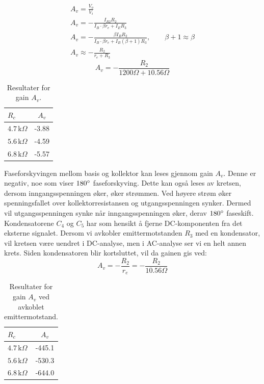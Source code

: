 \noindent
\begin{gather*}
A_v = \frac{V_o}{V_i} \\
A_v = - \frac{I_{R2}R_2}{I_B\cdot\beta r_e + I_E R_3} \\
A_v = - \frac{\beta I_B R_2}{I_B\cdot\beta r_e + I_B \left(\beta + 1\right) R_3}, \qquad \beta + 1 \approx \beta \\
A_v \approx - \frac{R_2}{r_e + R_3}
\end{gather*}
\vspace{1em}
\[
A_v = - \frac{R_2}{1200\Omega + 10.56\Omega}
\]







\begin{table}[H]
\centering
\caption{Resultater for gain $A_v$.}
\label{tab:gain_utregnet}
\vspace{1em}
\begin{tabular}{lc}
\toprule
\textbf{$R_c$} & \textbf{$A_v$} \\
\midrule
$4.7\,\text{k}\Omega$ & -3.88 \\
$5.6\,\text{k}\Omega$ & -4.59 \\
$6.8\,\text{k}\Omega$ & -5.57 \\
\bottomrule
\end{tabular}
\end{table}

\noindent
Faseforskyvingen mellom basis og kollektor kan leses gjennom gain $A_v$. Denne er negativ, noe som viser $180\degree$ faseforskyving. Dette kan også leses av kretsen, dersom inngangsspenningen øker, øker strømmen. Ved høyere strøm øker spenningsfallet over kollektorresistansen og utgangsspenningen synker. Dermed vil utgangsspenningen synke når inngangsspenningen øker, derav $180\degree$ faseskift. Kondensatorene $C_4$ og $C_5$ har som hensikt å fjerne DC-komponenten fra det eksterne signalet. Dersom vi avkobler emittermotstanden $R_3$ med en kondensator, vil kretsen være uendret i DC-analyse, men i AC-analyse ser vi en helt annen krets. Siden kondensatoren blir kortsluttet, vil da gainen gis ved:
\[
A_v = - \frac{R_2}{r_e} = - \frac{R_2}{10.56\Omega}
\]

\begin{table}[H]
\centering
\caption{Resultater for gain $A_v$ ved avkoblet emittermotstand.}
\label{tab:gain_utregnet_avkoblet_emitter}
\vspace{1em}
\begin{tabular}{lc}
\toprule
\textbf{$R_c$} & \textbf{$A_v$} \\
\midrule
$4.7\,\text{k}\Omega$ & -445.1 \\
$5.6\,\text{k}\Omega$ & -530.3 \\
$6.8\,\text{k}\Omega$ & -644.0 \\
\bottomrule
\end{tabular}
\end{table}

